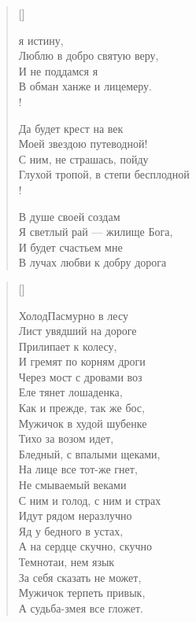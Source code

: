 \settowidth{\versewidth}{\vinГлухой тропой, в степи бесплодной...}
\begin{verse}[\versewidth]
\begin{patverse*}
 я истину,\\
Люблю в добро святую веру,\\
    И не поддамся я\\
В обман ханже и лицемеру.\\!

    Да будет крест на век\\
Моей звездою путеводной!\\
    С ним, не страшась, пойду\\
Глухой тропой, в степи бесплодной\ldotst\\!

    В душе своей создам\\
Я светлый рай --- жилище Бога,\\
    И будет счастьем мне\\
В лучах любви к добру дорога\ldotst
\end{patverse*}
\end{verse}

\newpage
\vspace*{0cm}

\settowidth{\versewidth}{\vin\vinЧерез мост с дровами воз}
\begin{verse}[\versewidth]
\begin{patverse}
Холод\ldotst Пасмурно в лесу\ldotst\\
   Лист увядший на дороге\\
	  Прилипает к колесу,\\
И гремят по корням дроги\ldotst\\
      Через мост с дровами воз\\
Еле тянет лошаденка,\\
      Как и прежде, так же бос,\\
Мужичок в худой шубенке\\
      Тихо за возом идет,\\
Бледный, с впалыми щеками,\\
      На лице все тот-же гнет,\\
Не смываемый веками\ldotst\\
      С ним и голод, с ним и страх\\
Идут рядом неразлучно\ldotst\\
      Яд у бедного в устах,\\
А на сердце скучно, скучно\ldotst\\
      Темнота\ldotst и, нем язык\\
За себя сказать не может,\\
      Мужичок терпеть привык,\\
А судьба-змея все гложет.
\end{patverse}
\end{verse}

